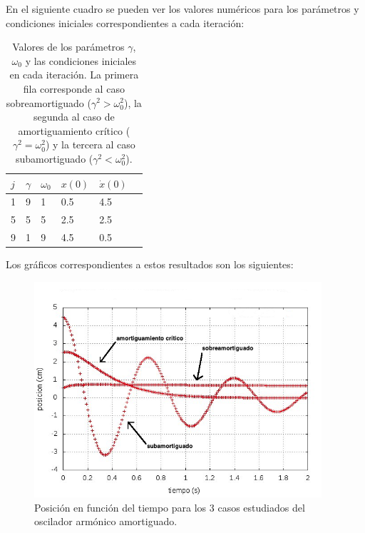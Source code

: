 \documentclass[a4paper,12pt]{article}
\begin{document}
En el siguiente cuadro se pueden ver los valores num\'ericos para los par\'ametros y condiciones iniciales correspondientes a cada iteraci\'on:

\begin{table}
	\centering
    \begin{tabular}{ | l | l | l | l | l |p{5cm} |}
    \hline
    $j$ & $\gamma$ & $\omega_0$ & $x(0)$ &  $\dot{x}(0)$ \\ \hline
    1 & 9 & 1 & 0.5 & 4.5 \\ \hline
    5 & 5 & 5 & 2.5 & 2.5 \\ \hline
    9 & 1 & 9 & 4.5 & 0.5 \\
    \hline
    \end{tabular}
    \caption{Valores de los par\'ametros $\gamma$, $\omega_0$ y las condiciones iniciales en cada iteraci\'on. La primera fila corresponde al caso sobreamortiguado ($\gamma^2 > \omega_0^2$), la segunda al caso de amortiguamiento cr\'itico ($\gamma^2 = \omega_0^2$) y la tercera al caso subamortiguado ($\gamma^2 < \omega_0^2$).}
    \label{table:1}
\end{table}
\newpage


Los gr\'aficos correspondientes a estos resultados son los siguientes:

\begin{figure}[H]
\begin{center}
\includegraphics[height=8cm]{grafico_ej2_xVSt.jpg}
\caption[width=5cm]{Posici\'on en funci\'on del tiempo para los 3 casos estudiados del oscilador arm\'onico amortiguado.}
\end{center}
\end{figure}
\end{document}
